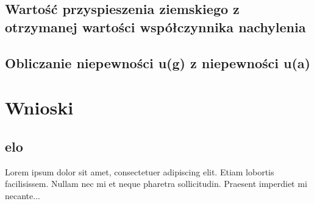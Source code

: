 \documentclass[18pt, twoside]{article}
\begin{document}
 \subsection{Wartość przyspieszenia 
ziemskiego z otrzymanej wartości współczynnika nachylenia}
 \subsection{Obliczanie niepewności u(g) z niepewności u(a) }
\section{Wnioski}
\subsection{elo}
Lorem ipsum dolor sit amet, consectetuer adipiscing elit.  
Etiam lobortis facilisissem.  Nullam nec mi et neque pharetra 
sollicitudin.  Praesent imperdiet mi necante...
\end{document}
